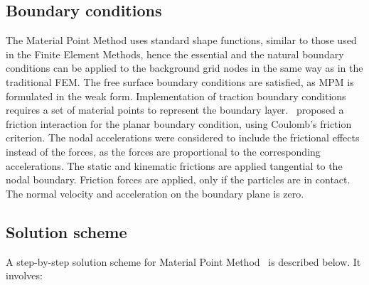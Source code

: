 \subsection{Boundary conditions}
The Material Point Method uses standard shape functions, similar to those used 
in the Finite Element Methods, hence the essential and the natural boundary 
conditions can be applied to the background grid nodes in the same way as in 
the traditional FEM. The free surface boundary conditions are satisfied, as MPM 
is formulated in the weak form. Implementation of traction boundary conditions 
requires a set of material points to represent the boundary 
layer.~\citet{Bandara2013} proposed a friction interaction for the planar 
boundary condition, using Coulomb's friction criterion. The nodal accelerations 
were considered to include the frictional effects instead of the forces, as the 
forces are proportional to the corresponding accelerations. The static and 
kinematic frictions are applied tangential to the nodal boundary. Friction 
forces are applied, only if the particles are in contact. The normal velocity 
and acceleration on the boundary plane is zero.

\subsection{Solution scheme}
A step-by-step solution scheme for Material Point Method~\citep{Bandara2009} is 
described below. It involves: 

